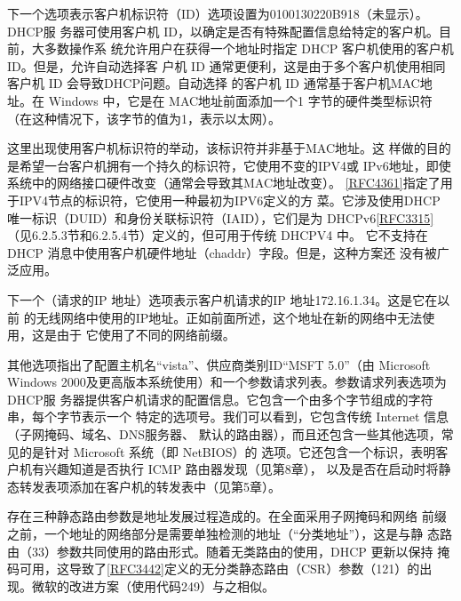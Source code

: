 下一个选项表示客户机标识符（ID）选项设置为0100130220B918（未显示）。DHCP服
务器可使用客户机 ID，以确定是否有特殊配置信息给特定的客户机。目前，大多数操作系
统允许用户在获得一个地址时指定 DHCP 客户机使用的客户机 ID。但是，允许自动选择客
户机 ID 通常更便利，这是由于多个客户机使用相同客户机 ID 会导致DHCP问题。自动选择
的客户机 ID 通常基于客户机MAC地址。在 Windows 中，它是在 MAC地址前面添加一个1
字节的硬件类型标识符（在这种情况下，该字节的值为1，表示以太网）。

\begin{tcolorbox}
    这里出现使用客户机标识符的举动，该标识符并非基于MAC地址。这
    样做的目的是希望一台客户机拥有一个持久的标识符，它使用不变的IPV4或
    IPv6地址，即使系统中的网络接口硬件改变（通常会导致其MAC地址改变）。
    \href{https://www.rfc-editor.org/rfc/rfc4361}{\href{https://www.rfc-editor.org/rfc/rfc4361}{[RFC4361]}}指定了用于IPV4节点的标识符，它使用一种最初为IPV6定义的方
    菜。它涉及使用DHCP 唯一标识（DUID）和身份关联标识符（IAID），它们是为
    DHCPv6\href{https://www.rfc-editor.org/rfc/rfc3315}{\href{https://www.rfc-editor.org/rfc/rfc3315}{[RFC3315]}}（见6.2.5.3节和6.2.5.4节）定义的，但可用于传统 DHCPV4 中。
    它不支持在 DHCP 消息中使用客户机硬件地址（chaddr）字段。但是，这种方案还
    没有被广泛应用。
\end{tcolorbox}

下一个（请求的IP 地址）选项表示客户机请求的IP 地址172.16.1.34。这是它在以前
的无线网络中使用的IP地址。正如前面所述，这个地址在新的网络中无法使用，这是由于
它使用了不同的网络前缀。

其他选项指出了配置主机名“vista”、供应商类别ID“MSFT 5.0”（由 Microsoft
Windows 2000及更高版本系统使用）和一个参数请求列表。参数请求列表选项为DHCP服
务器提供客户机请求的配置信息。它包含一个由多个字节组成的字符串，每个字节表示一个
特定的选项号。我们可以看到，它包含传统 Internet 信息（子网掩码、域名、DNS服务器、
默认的路由器），而且还包含一些其他选项，常见的是针对 Microsoft 系统（即 NetBIOS）的
选项。它还包含一个标识，表明客户机有兴趣知道是否执行 ICMP 路由器发现（见第8章），
以及是否在启动时将静态转发表项添加在客户机的转发表中（见第5章）。

\begin{tcolorbox}
    存在三种静态路由参数是地址发展过程造成的。在全面采用子网掩码和网络
    前缀之前，一个地址的网络部分是需要单独检测的地址（“分类地址”），这是与静
    态路由（33）参数共同使用的路由形式。随着无类路由的使用，DHCP 更新以保持
    掩码可用，这导致了\href{https://www.rfc-editor.org/rfc/rfc3442}{\href{https://www.rfc-editor.org/rfc/rfc3442}{[RFC3442]}}定义的无分类静态路由（CSR）参数（121）的出
    现。微软的改进方案（使用代码249）与之相似。
\end{tcolorbox}

